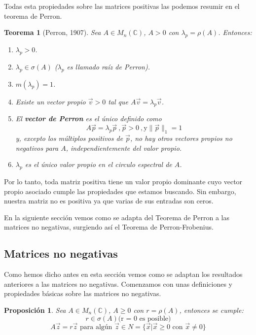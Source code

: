 \documentclass[size=a4, parskip=half, titlepage=false, toc=flat, toc=bib, 12pt]{scrartcl}
\theoremstyle{theorem-style}
\newtheorem{nth}{Teorema}[section]
\newtheorem{nprop}{Proposición}[section]
\theoremstyle{definition-style}
\theoremstyle{remark-style}
\theoremstyle{example-style}
\theoremstyle{definition-style}
\theoremstyle{remark-style}
\begin{document}
Todas esta propiedades sobre las matrices positivas las podemos resumir en el teorema de Perron.

\begin{nth}[Perron, 1907]
\label{perron}
Sea $A \in M_n(\mathbb{C})$, $A > 0$ con $\lambda_p = \rho(A)$. Entonces:
\begin{enumerate}
\item $\lambda_p >0$.
\item $\lambda_p \in \sigma(A)$ ($\lambda_p$ es llamado raíz de Perron).
\item $m(\lambda_p) = 1$.
\item Existe un vector propio $\vec{v} >0$ tal que $A\vec{v} = \lambda_p \vec{v}$.
\item El \textbf{vector de Perron} es el único definido como
$$A\vec{p} = \lambda_p \vec{p} \ , \vec{p} > 0 \ , \textrm{y} \|\vec{p}\|_1 = 1 $$
y, excepto los múltiplos positivos de $\vec{p}$, no hay otros vectores propios no negativos para $A$, independientemente del valor propio.
\item $\lambda_p$ es el único valor propio en el circulo espectral de $A$.
\end{enumerate}
\end{nth}

Por lo tanto, toda matriz positiva tiene un valor propio dominante cuyo vector propio asociado cumple las propiedades que estamos buscando. Sin embargo, nuestra matriz no es positiva ya que varias de sus entradas son ceros.

En la siguiente sección vemos como se adapta del Teorema de Perron a las matrices no negativas, surgiendo así el Teorema de Perron-Frobenius.

\subsection{Matrices no negativas}

Como hemos dicho antes en esta sección vemos como se adaptan los resultados anteriores a las matrices no negativas. Comenzamos con unas definiciones y propiedades básicas sobre las matrices no negativas.

\begin{nprop}
\label{geq}
Sea $A \in M_n(\mathbb{C})$, $A \geq 0$ con $r = \rho(A)$, entonces se cumple:
\begin{equation} r \in \sigma(A) \textrm{(r = 0 es posible)} \end{equation}
\begin{equation} \label{vectorpropio} A\vec{z} = r\vec{z} \textrm{ para algún } \vec{z} \in N = \{\vec{x} | \vec{x} \geq 0 \textrm{ con } \vec{x} \neq 0 \} \end{equation}
\end{nprop}
\end{document}
